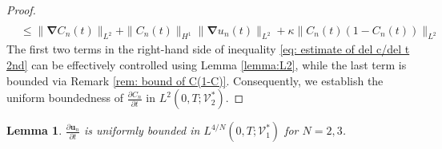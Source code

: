 \documentclass[final,3p,times]{elsarticle}
\newtheorem{lemma}{Lemma}
\theoremstyle{plain}
\theoremstyle{remark}
\theoremstyle{plain}
\theoremstyle{remark}
\begin{document}
\begin{proof}
\begin{align}
     \\
     &\leq \|\boldsymbol\nabla C_n(t)\|_{L^2} + \|C_n(t)\|_{H^1}\|\boldsymbol\nabla u_n(t)\|_{L^2} + \kappa \|C_n(t)(1-C_n(t))\|_{L^2} \label{eq: estimate of del c/del t 2nd}
      \end{align}
The first two terms in the right-hand side of inequality \eqref{eq: estimate of del c/del t 2nd} can be effectively controlled using Lemma \ref{lemma:L2}, while the last term is bounded via Remark \ref{rem: bound of C(1-C)}. Consequently, we establish the uniform boundedness of $ \displaystyle  \frac{\partial C_n}{\partial t} $ in $L^2\left(0,T;\mathscr V_2^*\right)$. 
\end{proof}
\begin{lemma}
	$ \displaystyle \frac{\partial \mathbf{u}_n}{\partial t}$ is uniformly bounded in $L^{4/N}\left(0,T;\mathscr V_1^*\right)$ for $N=2,3$. \label{lemma:L4}
\end{lemma}
\end{document}
